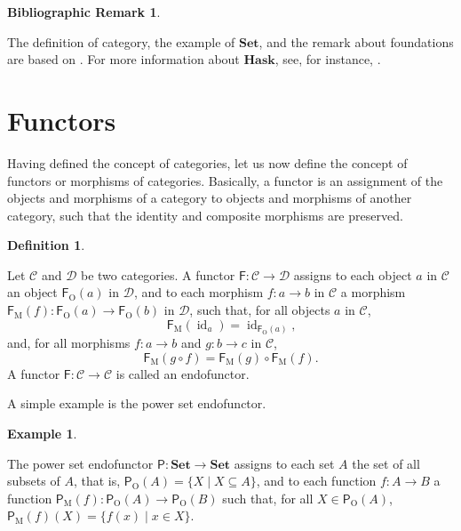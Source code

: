 \documentclass[11pt,letterpaper]{article}
\theoremstyle{definition}
\newtheorem{bibremark}{Bibliographic Remark}[section]
\newtheorem{definition}{Definition}[section]
\newtheorem{example}{Example}[section]
\DeclareMathOperator{\obj}{O}
\DeclareMathOperator{\mor}{M}
\DeclareMathOperator{\id}{id}
\newcommand{\idO}[1]{\natO{\id}{#1}}
\newcommand{\comp}{\ensuremath{\mathrel{\circ}}}
\newcommand{\cat}[1]{\ensuremath{\mathcal{#1}}}
\newcommand{\catbf}[1]{\ensuremath{\mathbf{#1}}\xspace}
\newcommand{\hask}{\catbf{Hask}}
\newcommand{\set}{\catbf{Set}}
\newcommand{\func}[1]{\ensuremath{\mathsf{#1}}}
\newcommand{\funcO}[1]{\ensuremath{\func{#1}_{\obj}}}
\newcommand{\funcM}[1]{\ensuremath{\func{#1}_{\mor}}}
\newcommand{\nat}[1]{\ensuremath{#1}}
\newcommand{\natO}[2]{\ensuremath{\nat{#1}_{#2}}}
\begin{document}
\begin{bibremark}
  \label{re:categories}

  The definition of category, the example of \set, and the remark
  about foundations are based on \parencites[4--5]{awodey-2010}[7--9,
    12, 21, 289]{maclane-1998}. For more information about \hask, see,
  for instance, \parencites[74]{elkins-2009}[22, 49--51]{yorgey-2009}.

\end{bibremark}


\section{Functors}
\label{sec:functors}

Having defined the concept of categories, let us now define the
concept of functors or morphisms of categories. Basically, a functor
is an assignment of the objects and morphisms of a category to objects
and morphisms of another category, such that the identity and
composite morphisms are preserved.

\begin{definition}
  \label{def:functor}


  Let \cat{C} and \cat{D} be two categories. A functor $\func{F}:
  \cat{C} \to \cat{D}$ assigns to each object $a$ in \cat{C} an object
  $\funcO{F}(a)$ in \cat{D}, and to each morphism $f: a \to b$ in
  \cat{C} a morphism $\funcM{F}(f): \funcO{F}(a) \to \funcO{F}(b)$ in
  \cat{D}, such that, for all objects $a$ in \cat{C},
  \begin{equation}
    \label{eq:functor-identity}
    \funcM{F}(\idO{a}) = \idO{\funcO{F}(a)}
    \text{,}
  \end{equation}
  and, for all morphisms $f: a \to b$ and $g: b \to c$ in \cat{C},
  \begin{equation}
    \label{eq:functor-composition}
    \funcM{F}(g \comp f) = \funcM{F}(g) \comp \funcM{F}(f)
    \text{.}
  \end{equation}
  A functor $\func{F}: \cat{C} \to \cat{C}$ is called an endofunctor.

\end{definition}

A simple example is the power set endofunctor.

\begin{example}
  \label{ex:functor-power-set}


  The power set endofunctor $\func{P}: \set \to \set$ assigns to each
  set $A$ the set of all subsets of $A$, that is, $\funcO{P}(A) = \{X
  \mid X \subseteq A\}$, and to each function $f: A \to B$ a function
  $\funcM{P}(f): \funcO{P}(A) \to \funcO{P}(B)$ such that, for all $X
  \in \funcO{P}(A)$, $\funcM{P}(f)(X) = \{f(x) \mid x \in X\}$.

\end{example}
\end{document}
